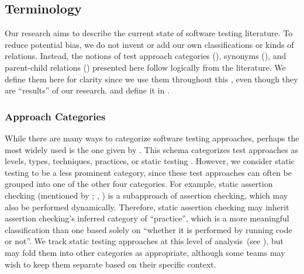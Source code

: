 \subsection{Terminology}
\label{terminology}

Our research aims to describe the current state of software testing
literature. To reduce potential bias, we do not invent or add our own
classifications or kinds of relations. Instead, the notions of test approach
categories (), synonyms (), and
parent-child relations () presented here
follow logically from the literature. We define them here for clarity
since we use them throughout this \docType{}, even though they are
``results'' of our research. \rigidBlurb{} and define it in .

\subsubsection{Approach Categories}
\label{categories-observ}

While there are many ways to categorize software testing approaches, perhaps
the most widely used is the one given by \ifnotpaper\else \citeauthor{IEEE2022}
\fi \citet{IEEE2022}. This schema categorizes test approaches as levels, types,
techniques, practices, or static testing \citeyearpar[Fig.~2; see
    ]{IEEE2022}. However, we consider static testing to be a
less prominent category, since these test approaches can often be grouped into
one of the other four categories. For example, static assertion checking
(mentioned by \ifnotpaper \citealp[p.~345]{LahiriEtAl2013};
    \citealp[p.~343]{ChalinEtAl2006}\else \citealp[p.~343]{ChalinEtAl2006},
    \citealp[p.~345]{LahiriEtAl2013}\fi) is a subapproach of assertion checking,
which may also be performed dynamically. Therefore, static assertion checking
may inherit assertion checking's inferred category of ``practice'', which is a
more meaningful classification than one based solely on ``whether it is
performed by running code or not''. We track static testing approaches at this
level of analysis\ifnotpaper\ (see )\fi, but may fold them
into other categories as appropriate, although some teams may wish to keep them
separate based on their specific context.

